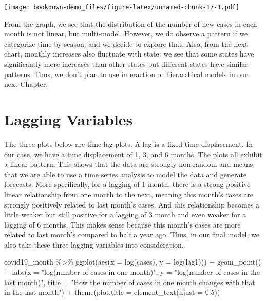 \documentclass[
]{book}
\newenvironment{Shaded}{\begin{snugshade}}{\end{snugshade}}
\newcommand{\AttributeTok}[1]{\textcolor[rgb]{0.77,0.63,0.00}{#1}}
\newcommand{\FloatTok}[1]{\textcolor[rgb]{0.00,0.00,0.81}{#1}}
\newcommand{\FunctionTok}[1]{\textcolor[rgb]{0.00,0.00,0.00}{#1}}
\newcommand{\NormalTok}[1]{#1}
\newcommand{\SpecialCharTok}[1]{\textcolor[rgb]{0.00,0.00,0.00}{#1}}
\newcommand{\StringTok}[1]{\textcolor[rgb]{0.31,0.60,0.02}{#1}}
\begin{document}
\texttt{[image: bookdown-demo\_files/figure-latex/unnamed-chunk-17-1.pdf]}

From the graph, we see that the distribution of the number of new cases in each month is not linear, but multi-model. However, we do observe a pattern if we categorize time by season, and we decide to explore that. Also, from the next chart, monthly increases also fluctuate with state: we see that some states have significantly more increases than other states but different states have similar patterns. Thus, we don't plan to use interaction or hierarchical models in our next Chapter.

\hypertarget{lagging-variables}{%
\section{Lagging Variables}\label{lagging-variables}}

The three plots below are time lag plots. A lag is a fixed time displacement. In our case, we have a time displacement of 1, 3, and 6 months. The plots all exhibit a linear pattern. This shows that the data are strongly non-random and means that we are able to use a time series analysis to model the data and generate forecasts. More specifically, for a lagging of 1 month, there is a strong positive linear relationship from one month to the next, meaning this month's cases are strongly positively related to last month's cases. And this relationship becomes a little weaker but still positive for a lagging of 3 month and even weaker for a lagging of 6 months. This makes sense because this month's cases are more related to last month's compared to half a year ago. Thus, in our final model, we also take these three lagging variables into consideration.

\begin{Shaded}
\begin{Highlighting}[]
\NormalTok{covid19\_month }\SpecialCharTok{\%\textgreater{}\%}
  \FunctionTok{ggplot}\NormalTok{(}\FunctionTok{aes}\NormalTok{(}\AttributeTok{x =} \FunctionTok{log}\NormalTok{(cases), }\AttributeTok{y =} \FunctionTok{log}\NormalTok{(lag1))) }\SpecialCharTok{+}
  \FunctionTok{geom\_point}\NormalTok{() }\SpecialCharTok{+}
  \FunctionTok{labs}\NormalTok{(}\AttributeTok{x =} \StringTok{"log(number of cases in one month)"}\NormalTok{, }\AttributeTok{y =} \StringTok{"log(number of cases in the last month)"}\NormalTok{, }\AttributeTok{title =} \StringTok{"How the number of cases in one month changes with that in the last month"}\NormalTok{) }\SpecialCharTok{+}
  \FunctionTok{theme}\NormalTok{(}\AttributeTok{plot.title =} \FunctionTok{element\_text}\NormalTok{(}\AttributeTok{hjust =} \FloatTok{0.5}\NormalTok{))}
\end{Highlighting}
\end{Shaded}
\end{document}
